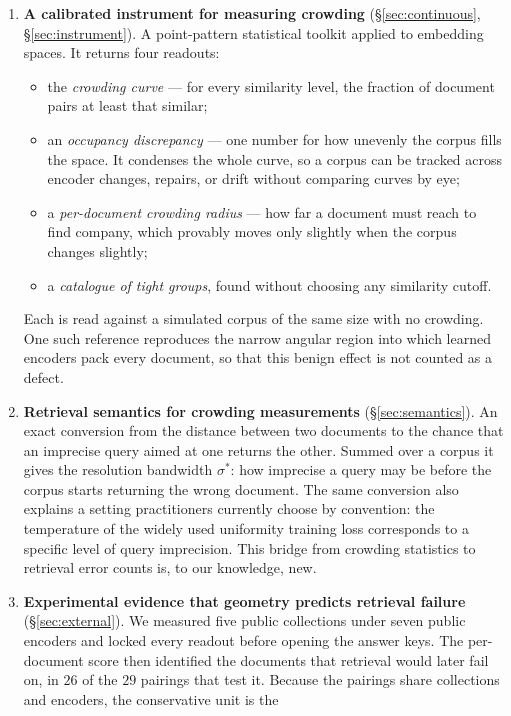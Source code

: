\documentclass[11pt,letterpaper]{article}
\newcommand{\sstar}{\sigma^{*}}
\begin{document}
\begin{enumerate}
\item \textbf{A calibrated instrument for measuring crowding}
  (\S\ref{sec:continuous}, \S\ref{sec:instrument}). A point-pattern
  statistical toolkit applied to embedding spaces. It
  returns four readouts:
  \begin{itemize}
  \item the \emph{crowding curve} --- for every similarity level, the
    fraction of document pairs at least that similar;
  \item an \emph{occupancy discrepancy} --- one number for how unevenly the corpus fills the space. It condenses the whole curve, so a corpus can be tracked across encoder changes, repairs, or drift without comparing curves by eye;
  \item a \emph{per-document crowding radius} --- how far a document
    must reach to find company, which provably moves only slightly when
    the corpus changes slightly;
  \item a \emph{catalogue of tight groups}, found without choosing any
    similarity cutoff.
  \end{itemize}
  Each is read against a simulated corpus of the same size with no
  crowding. One such reference reproduces the narrow angular region into
  which learned encoders pack every document, so that this benign effect
  is not counted as a defect.
\item \textbf{Retrieval semantics for crowding measurements}
  (\S\ref{sec:semantics}). An exact conversion from the distance between
  two documents to the chance that an imprecise query aimed at one returns
  the other. Summed over a corpus it gives the resolution bandwidth
  $\sstar$: how imprecise a query may be before the corpus starts
  returning the wrong document. The same conversion also explains a setting practitioners currently
  choose by convention: the temperature of the widely used uniformity
  training loss \cite{wang2020} corresponds to a specific level of
  query imprecision. This bridge from crowding statistics to retrieval error
counts
  is, to our knowledge, new.
\item \textbf{Experimental evidence that geometry predicts retrieval failure}
(\S\ref{sec:external}). We measured five public collections under seven
public encoders and locked every readout before opening the answer keys.
The per-document score then identified the documents that retrieval would
later fail on, in $26$ of the $29$ pairings that test it. Because the
pairings share collections and encoders, the conservative unit is the

\end{enumerate}
\end{document}
